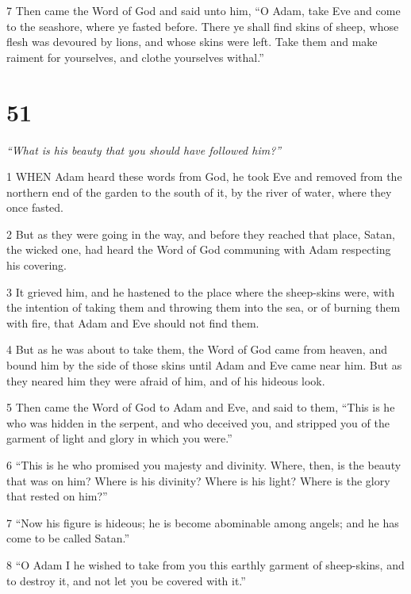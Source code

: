 \par 7 Then came the Word of God and said unto him, “O Adam, take Eve and come to the seashore, where ye fasted before. There ye shall find skins of sheep, whose flesh was devoured by lions, and whose skins were left. Take them and make raiment for yourselves, and clothe yourselves withal.”

\chapter{51}

\par \textit{“What is his beauty that you should have followed him?”}

\par 1 WHEN Adam heard these words from God, he took Eve and removed from the northern end of the garden to the south of it, by the river of water, where they once fasted.

\par 2 But as they were going in the way, and before they reached that place, Satan, the wicked one, had heard the Word of God communing with Adam respecting his covering.

\par 3 It grieved him, and he hastened to the place where the sheep-skins were, with the intention of taking them and throwing them into the sea, or of burning them with fire, that Adam and Eve should not find them.

\par 4 But as he was about to take them, the Word of God came from heaven, and bound him by the side of those skins until Adam and Eve came near him. But as they neared him they were afraid of him, and of his hideous look.

\par 5 Then came the Word of God to Adam and Eve, and said to them, “This is he who was hidden in the serpent, and who deceived you, and stripped you of the garment of light and glory in which you were.”

\par 6 “This is he who promised you majesty and divinity. Where, then, is the beauty that was on him? Where is his divinity? Where is his light? Where is the glory that rested on him?”

\par 7 “Now his figure is hideous; he is become abominable among angels; and he has come to be called Satan.”

\par 8 “O Adam I he wished to take from you this earthly garment of sheep-skins, and to destroy it, and not let you be covered with it.”

